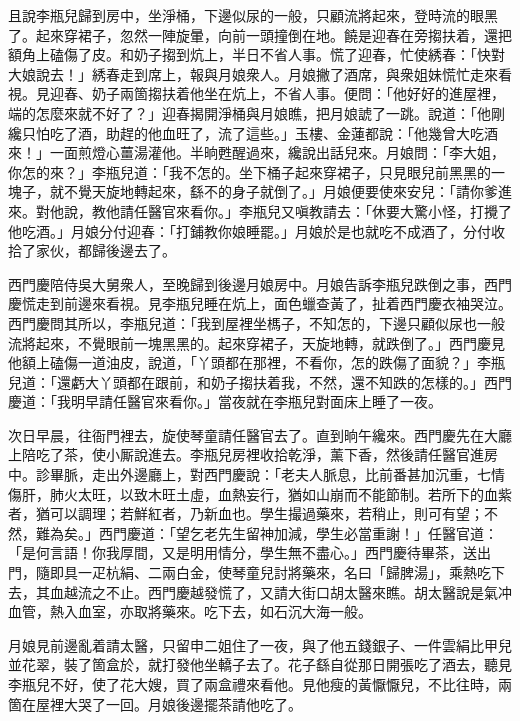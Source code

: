 且說李瓶兒歸到房中，坐淨桶，下邊似尿的一般，只顧流將起來，登時流的眼黑了。起來穿裙子，忽然一陣旋暈，向前一頭撞倒在地。饒是迎春在旁搊扶着，還把額角上磕傷了皮。和奶子搊到炕上，半日不省人事。慌了迎春，忙使綉春：「快對大娘說去！」綉春走到席上，報與月娘衆人。月娘撇了酒席，與衆姐妹慌忙走來看視。見迎春、奶子兩箇搊扶着他坐在炕上，不省人事。便問：「他好好的進屋裡，端的怎麼來就不好了？」迎春揭開淨桶與月娘瞧，把月娘諕了一跳。說道：「他剛纔只怕吃了酒，助趕的他血旺了，流了這些。」玉樓、金蓮都說：「他幾曾大吃酒來！」一面煎燈心薑湯灌他。半晌甦醒過來，纔說出話兒來。月娘問：「李大姐，你怎的來？」李瓶兒道：「我不怎的。坐下桶子起來穿裙子，只見眼兒前黑黑的一塊子，就不覺天旋地轉起來，繇不的身子就倒了。」月娘便要使來安兒：「請你爹進來。對他說，教他請任醫官來看你。」李瓶兒又嗔教請去：「休要大驚小怪，打攪了他吃酒。」{}月娘分付迎春：「打鋪教你娘睡罷。」月娘於是也就吃不成酒了，分付收拾了家伙，都歸後邊去了。

西門慶陪侍吳大舅衆人，至晚歸到後邊月娘房中。月娘告訴李瓶兒跌倒之事，西門慶慌走到前邊來看視。見李瓶兒睡在炕上，面色蠟查黃了，扯着西門慶衣袖哭泣。西門慶問其所以，李瓶兒道：「我到屋裡坐榪子，不知怎的，下邊只顧似尿也一般流將起來，不覺眼前一塊黑黑的。起來穿裙子，天旋地轉，就跌倒了。」西門慶見他額上磕傷一道油皮，說道，「丫頭都在那裡，不看你，怎的跌傷了面貌？」李瓶兒道：「還虧大丫頭都在跟前，和奶子搊扶着我，不然，還不知跌的怎樣的。」西門慶道：「我明早請任醫官來看你。」當夜就在李瓶兒對面床上睡了一夜。

次日早晨，往衙門裡去，旋使琴童請任醫官去了。直到晌午纔來。西門慶先在大廳上陪吃了茶，使小厮說進去。李瓶兒房裡收拾乾淨，薰下香，然後請任醫官進房中。診畢脈，走出外邊廳上，對西門慶說：「老夫人脈息，比前番甚加沉重，{}七情傷肝，肺火太旺，以致木旺土虛，血熱妄行，猶如山崩而不能節制。若所下的血紫者，猶可以調理；若鮮紅者，乃新血也。學生撮過藥來，若稍止，則可有望；不然，難為矣。」{}西門慶道：「望乞老先生留神加減，學生必當重謝！」任醫官道：「是何言語！你我厚間，又是明用情分，學生無不盡心。」西門慶待畢茶，送出門，隨即具一疋杭絹、二兩白金，使琴童兒討將藥來，名曰「歸脾湯」，乘熱吃下去，其血越流之不止。西門慶越發慌了，又請大街口胡太醫來瞧。胡太醫說是氣冲血管，熱入血室，亦取將藥來。吃下去，如石沉大海一般。

月娘見前邊亂着請太醫，只留申二姐住了一夜，與了他五錢銀子、一件雲絹比甲兒並花翠，裝了箇盒於，就打發他坐轎子去了。花子繇自從那日開張吃了酒去，聽見李瓶兒不好，使了花大嫂，買了兩盒禮來看他。見他瘦的黃懨懨兒，不比往時，兩箇在屋裡大哭了一回。{}月娘後邊擺茶請他吃了。

